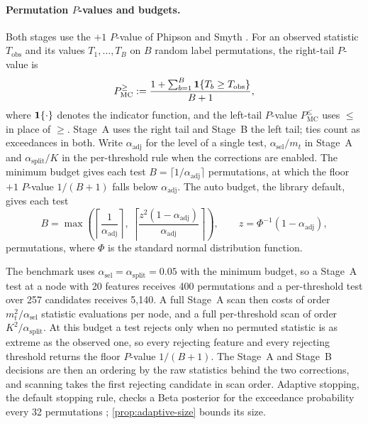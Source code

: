 \paragraph{Permutation $P$-values and budgets.}
Both stages use the $+1$ $P$-value of Phipson and Smyth
\citep{NorthCurtisSham2002EmpiricalPValuesMonteCarlo,PhipsonSmyth2010PermutationPValues}.
For an observed statistic $T_{\mathrm{obs}}$ and its values $T_1,\dots,T_B$ on
$B$ random label permutations, the right-tail $P$-value is
%
\begin{equation}
  P_{\mathrm{MC}}^{\ge} := \frac{1 + \sum_{b=1}^B \mathbf{1}\{T_b \ge T_{\mathrm{obs}}\}}{B+1},
  \label{eq:plusone}
\end{equation}
%
where $\mathbf{1}\{\cdot\}$ denotes the indicator function, and the left-tail
$P$-value $P_{\mathrm{MC}}^{\le}$ uses $\le$ in place of $\ge$. Stage~A uses the
right tail and Stage~B the left tail; ties count as exceedances in both. Write
$\alpha_{\mathrm{adj}}$ for the level of a single test,
$\alpha_{\mathrm{sel}}/m_t$ in Stage~A and $\alpha_{\mathrm{split}}/K$ in the
per-threshold rule when the corrections are enabled. The minimum budget gives
each test $B=\lceil 1/\alpha_{\mathrm{adj}}\rceil$ permutations, at which the floor
$+1$ $P$-value $1/(B+1)$ falls below $\alpha_{\mathrm{adj}}$. The
auto budget, the library default, gives each test
%
\begin{equation}
  B = \max\!\left(\left\lceil \frac{1}{\alpha_{\mathrm{adj}}} \right\rceil,\
  \left\lceil \frac{z^2(1-\alpha_{\mathrm{adj}})}{\alpha_{\mathrm{adj}}} \right\rceil\right),
  \qquad z=\Phi^{-1}(1-\alpha_{\mathrm{adj}}),
  \label{eq:auto-budget}
\end{equation}
%
permutations, where $\Phi$ is the standard normal distribution function.

The benchmark uses $\alpha_{\mathrm{sel}}=\alpha_{\mathrm{split}}=0.05$ with the
minimum budget, so a Stage~A test at a node with 20 features receives 400
permutations and a per-threshold test over 257 candidates receives 5{,}140. A
full Stage~A scan then costs of order $m_t^2/\alpha_{\mathrm{sel}}$ statistic
evaluations per node, and a full per-threshold scan of order
$K^2/\alpha_{\mathrm{split}}$. At this budget a test rejects only when no
permuted statistic is as extreme as the observed one, so every rejecting
feature and every rejecting threshold returns the floor $P$-value $1/(B+1)$.
The Stage~A and Stage~B decisions are then an ordering by the raw statistics
behind the two corrections, and scanning takes the first rejecting candidate in
scan order. Adaptive stopping, the default stopping rule, checks a Beta
posterior for the exceedance probability every 32 permutations
\citep{BesagClifford1991SequentialMonteCarloPValues,Gandy2009SequentialImplementationMonteCarloTests};
\cref{prop:adaptive-size} bounds its size.

